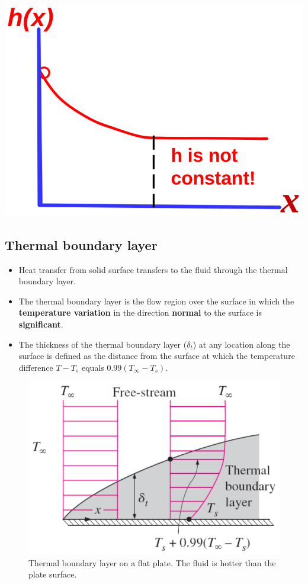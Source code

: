 \documentclass[11pt]{article}
\begin{document}
\begin{center}
\includegraphics[width=.9\linewidth]{./images/local-heat-transfer-coefficient-graph.png}
\end{center}

 \newpage
\subsection{Thermal boundary layer}
\label{sec:orgb312404}
\begin{itemize}
\item Heat transfer from solid surface transfers to the fluid through the thermal boundary layer.
\item The thermal boundary layer is the flow region over the surface in which the \textbf{temperature variation} in the direction \textbf{normal} to the surface is \textbf{significant}.
\item The thickness of the thermal boundary layer (\(\delta_t\)) at any location along the surface is defined as the distance from the surface at which the temperature difference \(T - T_s\) equals \(0.99 (T_{\infty} - T_s)\).
\end{itemize}

\begin{figure}[htbp]
\centering
\includegraphics[width=.9\linewidth]{./images/thermal-boundary-layer-diagram.png}
\caption{Thermal boundary layer on a flat plate. The fluid is hotter than the plate surface.}
\end{figure}
\end{document}
